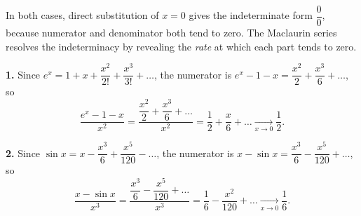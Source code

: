 \documentclass[11pt]{article}
\begin{document}
\begin{corrige}
In both cases, direct substitution of $x = 0$ gives the indeterminate form $\dfrac{0}{0}$, because numerator and denominator both tend to zero. The Maclaurin series resolves the indeterminacy by revealing the \emph{rate} at which each part tends to zero.

\textbf{1.} Since $e^x = 1 + x + \dfrac{x^2}{2!} + \dfrac{x^3}{3!} + \dots$, the numerator is $e^x - 1 - x = \dfrac{x^2}{2} + \dfrac{x^3}{6} + \dots$, so
\[ \frac{e^x - 1 - x}{x^2} = \frac{\dfrac{x^2}{2} + \dfrac{x^3}{6} + \dots}{x^2} = \frac{1}{2} + \frac{x}{6} + \dots \xrightarrow[x\to 0]{} \frac{1}{2}. \]

\textbf{2.} Since $\sin x = x - \dfrac{x^3}{6} + \dfrac{x^5}{120} - \dots$, the numerator is $x - \sin x = \dfrac{x^3}{6} - \dfrac{x^5}{120} + \dots$, so
\[ \frac{x - \sin x}{x^3} = \frac{\dfrac{x^3}{6} - \dfrac{x^5}{120} + \dots}{x^3} = \frac{1}{6} - \frac{x^2}{120} + \dots \xrightarrow[x\to 0]{} \frac{1}{6}. \]
\end{corrige}
\end{document}
